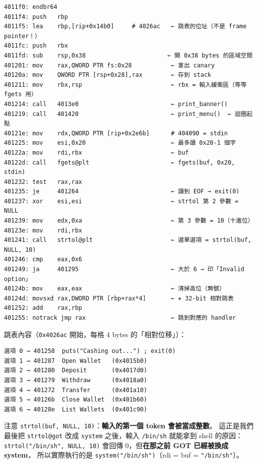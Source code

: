 \documentclass[10pt,a4paper]{article}
\renewenvironment{quote}{%
  \begin{mdframed}[linewidth=0pt,innerleftmargin=0pt,innerrightmargin=0pt,
    innerbottommargin=0pt,innertopmargin=0pt,skipabove=0.55em,skipbelow=0.55em,
    leftmargin=0.9em,rightmargin=0.4em,startcode={\color{quotebar}\vrule width 2.6pt},%
    endcode={}]%
  \itshape\color{black}%
}{%
  \end{mdframed}%
}
\begin{document}
\begin{Verbatim}[breaklines=true,breakanywhere=true,breakautoindent=false,fontsize=\fontsize{7.0}{9.5}\selectfont]
4011f0: endbr64
4011f4: push   rbp
4011f5: lea    rbp,[rip+0x14b0]     # 4026ac   ← 跳表的位址（不是 frame pointer！）
4011fc: push   rbx
4011fd: sub    rsp,0x38                       ← 開 0x38 bytes 的區域空間
401201: mov    rax,QWORD PTR fs:0x28           ← 拿出 canary
40120a: mov    QWORD PTR [rsp+0x28],rax        ← 存到 stack
401211: mov    rbx,rsp                         ← rbx = 輸入緩衝區（等等 fgets 用）
401214: call   4013e0                          ← print_banner()
401219: call   401420                          ← print_menu()  ← 迴圈起點
40121e: mov    rdx,QWORD PTR [rip+0x2e6b]      # 404090 = stdin
401225: mov    esi,0x20                        ← 最多讀 0x20-1 個字
40122a: mov    rdi,rbx                         ← buf
40122d: call   fgets@plt                       ← fgets(buf, 0x20, stdin)
401232: test   rax,rax
401235: je     401264                          ← 讀到 EOF → exit(0)
401237: xor    esi,esi                         ← strtol 第 2 參數 = NULL
401239: mov    edx,0xa                         ← 第 3 參數 = 10（十進位）
40123e: mov    rdi,rbx
401241: call   strtol@plt                      ← 選單選項 = strtol(buf, NULL, 10)
401246: cmp    eax,0x6
401249: ja     401295                          ← 大於 6 → 印「Invalid option」
40124b: mov    eax,eax                         ← 清掉高位（無號）
40124d: movsxd rax,DWORD PTR [rbp+rax*4]       ← ✶ 32-bit 相對跳表
401252: add    rax,rbp
401255: notrack jmp rax                        ← 跳到對應的 handler
\end{Verbatim}

跳表內容（\texttt{0x4026ac} 開始，每格 4 bytes 的「相對位移」）：

\begin{Verbatim}[breaklines=true,breakanywhere=true,breakautoindent=false,fontsize=\fontsize{7.0}{9.5}\selectfont]
選項 0 → 401258  puts("Cashing out...") ; exit(0)
選項 1 → 401287  Open Wallet   (0x4015b0)
選項 2 → 401280  Deposit       (0x4017d0)
選項 3 → 401279  Withdraw      (0x4018a0)
選項 4 → 401272  Transfer      (0x401a10)
選項 5 → 40126b  Close Wallet  (0x401b60)
選項 6 → 40128e  List Wallets  (0x401c90)
\end{Verbatim}

\begin{quote}
注意 \texttt{strtol(buf,\allowbreak{}\ \allowbreak{}NULL,\allowbreak{}\ \allowbreak{}10)}：\textbf{輸入的第一個 token
會被當成整數}。 這正是我們最後把 \texttt{strtol@got} 改成
\texttt{system} 之後，輸入 \texttt{/\allowbreak{}bin/\allowbreak{}sh} 就能拿到 shell 的原因：
\texttt{strtol("/\allowbreak{}bin/\allowbreak{}sh",\allowbreak{}\ \allowbreak{}NULL,\allowbreak{}\ \allowbreak{}10)} 會回傳 0，但\textbf{在那之前 GOT
已經被換成 system}， 所以實際執行的是 \texttt{system("/\allowbreak{}bin/\allowbreak{}sh")}（rdi =
buf = \texttt{"/\allowbreak{}bin/\allowbreak{}sh"}）。
\end{quote}
\end{document}
